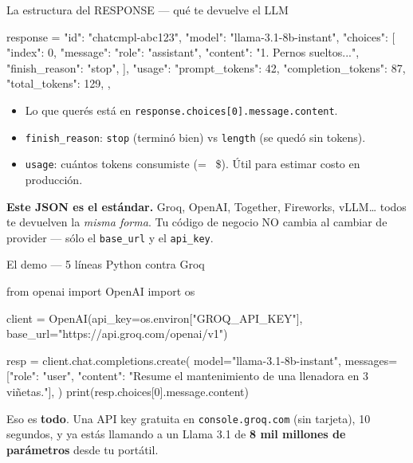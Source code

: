 \documentclass[aspectratio=169, 11pt]{beamer}
\begin{document}
\begin{frame}{La estructura del RESPONSE --- qué te devuelve el LLM}
  \vspace{2pt}
  \begin{pyblock}
response = {
    "id":      "chatcmpl-abc123",
    "model":   "llama-3.1-8b-instant",
    "choices": [
        {
            "index": 0,
            "message":       {"role": "assistant", "content": "1. Pernos sueltos..."},
            "finish_reason": "stop",
        }
    ],
    "usage": {
        "prompt_tokens":     42,
        "completion_tokens": 87,
        "total_tokens":      129,
    },
}
  \end{pyblock}
  \vspace{2pt}
  \begin{itemize}\setlength{\itemsep}{2pt}
    \footnotesize
    \item Lo que querés está en \texttt{response.choices[0].message.content}.
    \item \texttt{finish\_reason}: \texttt{stop} (terminó bien) vs \texttt{length} (se quedó sin tokens).
    \item \texttt{usage}: cuántos tokens consumiste (=~ \$). Útil para estimar costo en producción.
  \end{itemize}
  \vspace{2pt}
  \begin{tcolorbox}[colback=arcaGray, colframe=arcaRed, leftrule=3pt,
    boxrule=0pt, sharp corners, left=8pt, right=8pt, top=3pt, bottom=3pt]
    {\footnotesize\color{arcaDark}
    \textbf{Este JSON es el estándar.} Groq, OpenAI, Together, Fireworks, vLLM\dots
    todos te devuelven la \emph{misma forma}. Tu código de negocio NO cambia al cambiar
    de provider --- sólo el \texttt{base\_url} y el \texttt{api\_key}.}
  \end{tcolorbox}
\end{frame}

\begin{frame}{El demo --- 5 líneas Python contra Groq}
  \begin{pyblock}
from openai import OpenAI
import os

client = OpenAI(api_key=os.environ["GROQ_API_KEY"],
                base_url="https://api.groq.com/openai/v1")

resp = client.chat.completions.create(
    model="llama-3.1-8b-instant",
    messages=[{"role": "user",
               "content": "Resume el mantenimiento de una llenadora en 3 viñetas."}],
)
print(resp.choices[0].message.content)
  \end{pyblock}
  \vspace{4pt}
  {\footnotesize\color{arcaDark}
  Eso es \textbf{todo}. Una API key gratuita en \texttt{console.groq.com} (sin tarjeta),
  10 segundos, y ya estás llamando a un Llama 3.1 de \textbf{8 mil millones de parámetros}
  desde tu portátil.}
\end{frame}
\end{document}
